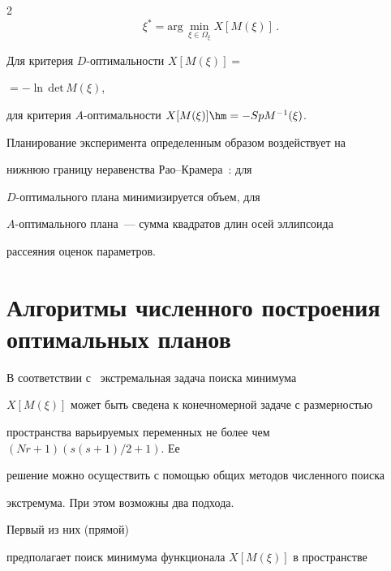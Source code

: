 \begin{multicols}{2}
\begin{equation}
  \xi^* =\mathrm{arg}\,\min_{\xi\in\Omega_\xi} X[M(\xi)]\,.


  \label{e18-c}


  \end{equation}


Для критерия $D$-оп\-ти\-маль\-ности $X[M(\xi)] =$\linebreak


$=-\ln\,\mathrm{det}\,M(\xi)$,


для критерия $A$-оп\-ти\-маль\-ности $X[M(\xi)]\hm =-Sp M^{-1}(\xi)$.





  Планирование эксперимента определенным образом воздействует на


нижнюю границу неравенства Рао--Кра\-ме\-ра~\cite{20-c}: для


  $D$-оп\-ти\-маль\-но\-го плана минимизируется объем, для


  $A$-оп\-ти\-маль\-ного плана~--- сумма квадратов длин осей эллипсоида


рассеяния оценок параметров.





\vspace*{-6pt}





\section{Алгоритмы численного построения оптимальных планов}





\vspace*{-3pt}





  В соответствии с~\cite{21-c} экстремальная задача поиска минимума


$X[M(\xi)]$ может быть сведена к конечномерной задаче с размерностью


пространства варьируемых переменных не более чем $(Nr+1)(s(s+1)/2+1)$. Ее


решение можно осуществить с помощью общих методов численного поиска


экстремума. При этом возможны два подхода. 


Первый из них (прямой)


предполагает поиск минимума функционала $X[M(\xi)]$ в про\-стран\-ст\-ве



\end{multicols}
